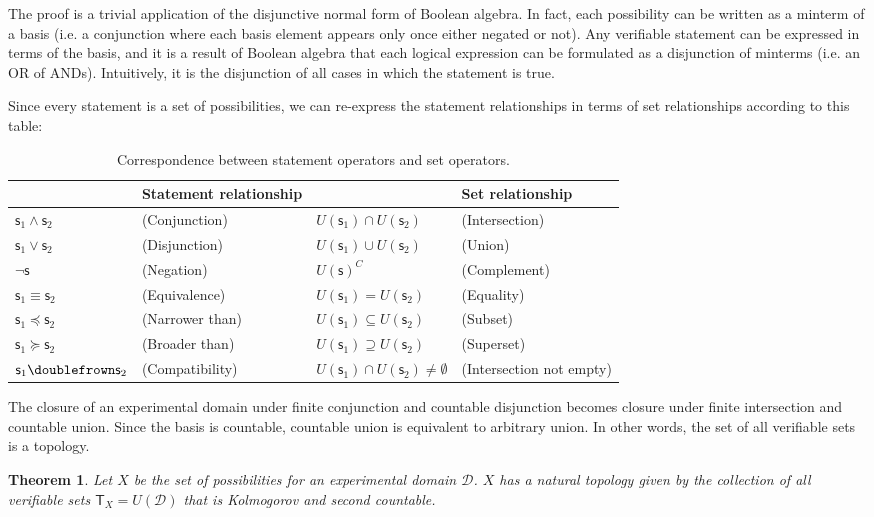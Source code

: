 \documentclass[letterpaper]{article}
\theoremstyle{plain}%
\newtheorem{thrm}{Theorem}[section]
\theoremstyle{definition}
\theoremstyle{remark}
\numberwithin{equation}{section}
\def\comp{\doublefrown}
\def\narrower{\preccurlyeq}
\def\broader{\succcurlyeq}
\def\AND{\wedge}
\def\OR{\vee}
\def\NOT{\neg}
\newcommand{\stmt}[1][s] {\mathsf{#1}}
\newcommand{\edomain}[1][D] {\mathcal{#1}}
\begin{document}
The proof is a trivial application of the disjunctive normal form of Boolean algebra. In fact, each possibility can be written as a minterm of a basis (i.e. a conjunction where each basis element appears only once either negated or not). Any verifiable statement can be expressed in terms of the basis, and it is a result of Boolean algebra that each logical expression can be formulated as a disjunction of minterms (i.e. an OR of ANDs). Intuitively, it is the disjunction of all cases in which the statement is true.

Since every statement is a set of possibilities, we can re-express the statement relationships in terms of set relationships according to this table:

\begin{table}[h]
	\centering
	\begin{tabular}{p{} p{} p{} p{}}
		& Statement relationship & & Set relationship  \\ 
		\hline 
		$\stmt_1 \AND \stmt_2$ & (Conjunction) & $U(\stmt_1) \cap U(\stmt_2)$ & (Intersection) \\ 
		$\stmt_1 \OR \stmt_2$ & (Disjunction) & $U(\stmt_1) \cup U(\stmt_2)$ & (Union) \\ 
		$\NOT \stmt$ & (Negation) & $U(\stmt)^C$ & (Complement) \\ 
		$\stmt_1 \equiv \stmt_2$ & (Equivalence) & $U(\stmt_1) = U(\stmt_2)$ & (Equality) \\ 
		$\stmt_1 \narrower \stmt_2$ & (Narrower than) & $U(\stmt_1) \subseteq U(\stmt_2)$ & (Subset) \\ 
		$\stmt_1 \broader \stmt_2$ & (Broader than) & $U(\stmt_1) \supseteq U(\stmt_2)$ & (Superset) \\ 
		$\stmt_1 \comp \stmt_2$ & (Compatibility) & $U(\stmt_1) \cap U(\stmt_2) \neq \emptyset$ & (Intersection not empty)
	\end{tabular} 
	\caption{Correspondence between statement operators and set operators.}
\end{table}

The closure of an experimental domain under finite conjunction and countable disjunction becomes closure under finite intersection and countable union. Since the basis is countable, countable union is equivalent to arbitrary union. In other words, the set of all verifiable sets is a topology.

\begin{thrm}
	Let $X$ be the set of possibilities for an experimental domain $\edomain$. $X$ has a natural topology given by the collection of all verifiable sets $\mathsf{T}_X=U(\edomain)$ that is Kolmogorov and second countable.
\end{thrm}
\end{document}
